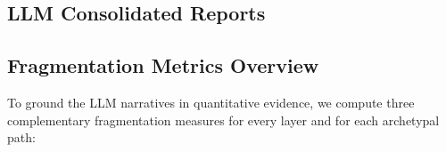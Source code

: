 % 
% 
% 
% 
% 

\subsection{LLM Consolidated Reports}

\subsection{Fragmentation Metrics Overview}

To ground the LLM narratives in quantitative evidence, we compute 
three complementary fragmentation measures for every layer and for each
archetypal path:

